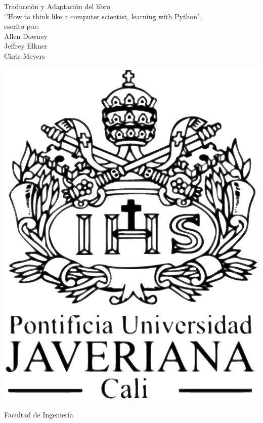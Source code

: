 \newpage
\thispagestyle{empty}
{\pagestyle{empty}\linespread{1}\parindent0pt
\vspace*{0.5cm}

\vfill 

\begin{center}
{\huge \textbf{\introprog}
\par	{} 
     }

\end{center}

\vfill
\begin{flushright}
{\small
Traducción y Adaptación del libro \\
`'How to think like a computer scientist, learning with Python", \\
escrito por: \\
Allen Downey\\
Jeffrey Elkner\\
Chris Meyers\\
}
\end{flushright}

\vfill



\begin{center}
\includegraphics[scale=0.2]{illustrations/logo/LogoVerticalNegro.eps} 
\end{center}
\begin{center} {\Large Facultad de Ingeniería} \end{center}
\vfill

}
\pagebreak


